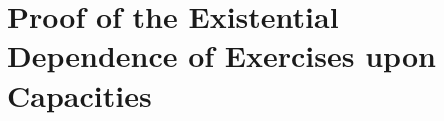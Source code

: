 \documentclass[12pt]{article}
\begin{document}







\pagebreak

\appendix
\section{Proof of the Existential Dependence of Exercises upon Capacities} %
\label{sec:appendix}
\end{document}
